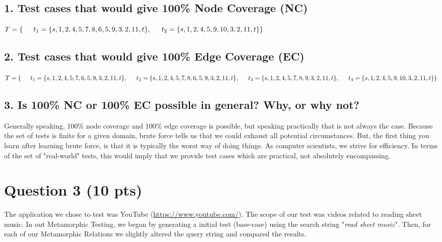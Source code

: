 \documentclass[12pt]{article}
\begin{document}
\subsection*{1. Test cases that would give 100\% Node Coverage (NC)}


$T = \{ \newline 
\indent t_{1} = \{s, 1, 2, 4, 5, 7, 8, 6, 5, 9, 3, 2, 11, t\}, \newline
\indent t_{2} = \{s, 1, 2, 4, 5, 9, 10, 3, 2, 11, t\} \newline
\}$

\subsection*{2. Test cases that would give 100\% Edge Coverage (EC)}

$T = \{ \newline 
\indent t_{1} = \{s, 1, 2, 4, 5, 7, 6, 5, 9, 3, 2, 11, t\}, \newline
\indent t_{2} = \{s, 1, 2, 4, 5, 7, 8, 6, 5, 9, 3, 2, 11, t\}, \newline
\indent t_{3} = \{s, 1, 2, 4, 5, 7, 8, 9, 3, 2, 11, t\}, \newline
\indent t_{4} = \{s, 1, 2, 4, 5, 9, 10, 3, 2, 11, t\} \newline
\}$

\subsection*{3. Is 100\% NC or 100\% EC possible in general? Why, or why not?}

Generally speaking, 100\% node coverage and 100\% edge coverage is possible, but speaking practically that is not always the case. Because the set of tests is finite for a given domain, brute force tells us that we could exhaust all potential circumstances. But, the first thing you learn after learning brute force, is that it is typically the worst way of doing things. As computer scientists, we strive for efficiency. In terms of the set of "real-world" tests, this would imply that we provide test cases which are practical, not absolutely encompassing.

\newpage
\section*{Question 3 (10 pts)}

The application we chose to test was YouTube (\url{https://www.youtube.com/}). The scope of our test was videos related to reading sheet music. In out Metamorphic Testing, we began by generating a initial test (base-case) using the search string "\textit{read sheet music}". Then, for each of our Metamorphic Relations we slightly altered the query string and compared the results.
\end{document}
